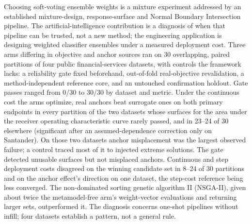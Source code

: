 Choosing soft-voting ensemble weights is a mixture experiment addressed by an established mixture-design,
response-surface and Normal Boundary Intersection pipeline. The artificial-intelligence contribution is a diagnosis
of when that pipeline can be trusted, not a new method; the engineering application is designing weighted classifier
ensembles under a measured deployment cost. Three arms differing in objective and anchor sources ran on 30
overlapping, paired partitions of four public financial-services datasets, with controls the framework lacks: a
reliability gate fixed beforehand, out-of-fold real-objective revalidation, a method-independent reference core, and an
untouched confirmation holdout. Gate passes ranged from 0/30 to 30/30 by
dataset and metric. Under the continuous cost the arms optimize, real anchors beat surrogate ones on both primary endpoints in
every partition of the two datasets whose surfaces for the area under the receiver operating characteristic curve
rarely passed, and in 23--24 of 30 elsewhere (significant after an assumed-dependence correction only on Santander). On those two
datasets anchor misplacement was the largest observed failure; a control traced most of it to injected extreme
solutions. The gate detected unusable surfaces but not misplaced anchors. Continuous and step deployment costs
disagreed on the winning candidate set in 8--24 of 30 partitions and on the anchor effect's direction on one dataset,
the step-cost reference being less converged.
The non-dominated sorting genetic algorithm II (NSGA-II), given about twice the metamodel-free arm's weight-vector
evaluations and returning larger sets, outperformed it. The diagnosis concerns one-shot pipelines without infill; four datasets establish a
pattern, not a general rule.
